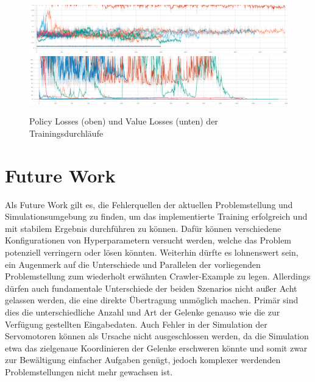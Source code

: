 \begin{figure}
    \centering
    \includegraphics[width = \textwidth]{Bilder/ml-agents/Losses_Policy Loss.pdf}
    \includegraphics[width = \textwidth]{Bilder/ml-agents/Losses_Value Loss.pdf}
    \caption[Policy und Value Losses der Trainingsdurchläufe]{Policy Losses (oben) und Value Losses (unten) der Trainingsdurchläufe}
    \label{fig:losses}
\end{figure}


\section{Future Work}
Als Future Work gilt es, die Fehlerquellen der aktuellen Problemstellung und Simulationsumgebung zu finden, um das implementierte Training erfolgreich und mit stabilem Ergebnis durchführen zu können.
Dafür können verschiedene Konfigurationen von Hyperparametern versucht werden, welche das Problem potenziell verringern oder lösen könnten.
Weiterhin dürfte es lohnenswert sein, ein Augenmerk auf die Unterschiede und Parallelen der vorliegenden Problemstellung zum wiederholt erwähnten Crawler-Example zu legen.
Allerdings dürfen auch fundamentale Unterschiede der beiden Szenarios nicht außer Acht gelassen werden, die eine direkte Übertragung unmöglich machen.
Primär sind dies die unterschiedliche Anzahl und Art der Gelenke genauso wie die zur Verfügung gestellten Eingabedaten.
Auch Fehler in der Simulation der Servomotoren können als Ursache nicht ausgeschlossen werden, da die Simulation etwa das zielgenaue Koordinieren der Gelenke erschweren könnte und somit zwar zur Bewältigung einfacher Aufgaben genügt, jedoch komplexer werdenden Problemstellungen nicht mehr gewachsen ist.

